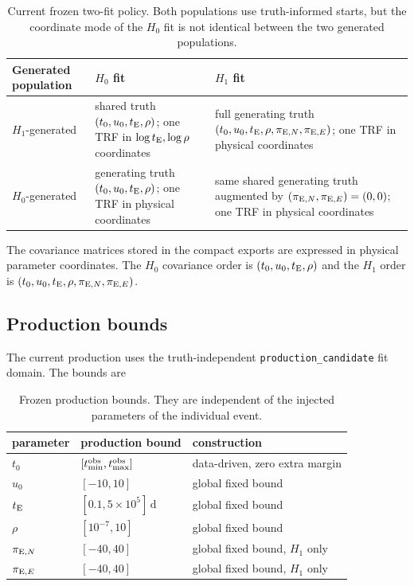 \documentclass[11pt,a4paper]{article}
\newcommand{\pen}{\pi_{{\rm E},N}}
\newcommand{\pee}{\pi_{{\rm E},E}}
\newcommand{\te}{t_{\rm E}}
\newcommand{\Hnull}{H_0}
\newcommand{\Halt}{H_1}
\begin{document}
\begin{table}[H]
\centering
\small
\begin{tabular}{>{\RaggedRight\arraybackslash}p{2.2cm}
                >{\RaggedRight\arraybackslash}p{5.5cm}
                >{\RaggedRight\arraybackslash}p{5.5cm}}
\toprule
Generated population & $\Hnull$ fit & $\Halt$ fit\\
\midrule
$\Halt$-generated & shared truth $(t_0,u_0,\te,\rho)$; one TRF in
$\log\te,\log\rho$ coordinates & full generating truth
$(t_0,u_0,\te,\rho,\pen,\pee)$; one TRF in physical coordinates\\[0.3em]
$\Hnull$-generated & generating truth $(t_0,u_0,\te,\rho)$; one TRF in
physical coordinates & same shared generating truth augmented by
$(\pen,\pee)=(0,0)$; one TRF in physical coordinates\\
\bottomrule
\end{tabular}
\caption{Current frozen two-fit policy.  Both populations use truth-informed starts, but the
coordinate mode of the $\Hnull$ fit is not identical between the two generated populations.}
\end{table}

The covariance matrices stored in the compact exports are expressed in physical parameter
coordinates.  The $\Hnull$ covariance order is $(t_0,u_0,\te,\rho)$ and the $\Halt$ order is
$(t_0,u_0,\te,\rho,\pen,\pee)$.

\subsection{Production bounds}

The current production uses the truth-independent \texttt{production\_candidate} fit domain.
The bounds are
\begin{table}[H]
\centering
\begin{tabular}{lll}
\toprule
parameter & production bound & construction\\
\midrule
$t_0$ & $[t_{\min}^{\rm obs},t_{\max}^{\rm obs}]$ & data-driven, zero extra margin\\
$u_0$ & $[-10,10]$ & global fixed bound\\
$\te$ & $[0.1,5\times10^5]\,$d & global fixed bound\\
$\rho$ & $[10^{-7},10]$ & global fixed bound\\
$\pen$ & $[-40,40]$ & global fixed bound, $\Halt$ only\\
$\pee$ & $[-40,40]$ & global fixed bound, $\Halt$ only\\
\bottomrule
\end{tabular}
\caption{Frozen production bounds.  They are independent of the injected parameters of the
individual event.}
\end{table}
\end{document}

